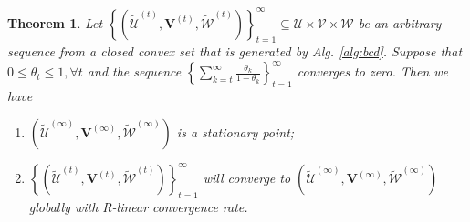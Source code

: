 \documentclass{article}
\newtheorem{thm}{Theorem}
\begin{document}
\begin{thm}\label{thm:BCD}
Let $\left\{\left(\tilde{\mathcal{U}}^{(t)}, \mathbf{V}^{(t)}, \tilde{\mathcal{W}}^{(t)}\right)\right\}_{t=1}^{\infty}\subseteq\mathcal{U}\times\mathcal{V}\times\mathcal{W}$ be an arbitrary sequence from a closed convex set that is generated by Alg. \ref{alg:bcd}. Suppose that $0\leq\theta_t\leq 1, \forall t$ and the sequence $\left\{\sum_{k=t}^{\infty}\frac{\theta_k}{1-\theta_k}\right\}_{t=1}^{\infty}$ converges to zero. Then we have
\begin{enumerate}
\item $\left(\tilde{\mathcal{U}}^{(\infty)}, \mathbf{V}^{(\infty)}, \tilde{\mathcal{W}}^{(\infty)}\right)$ is a stationary point;
\item $\left\{\left(\tilde{\mathcal{U}}^{(t)}, \mathbf{V}^{(t)}, \tilde{\mathcal{W}}^{(t)}\right)\right\}_{t=1}^{\infty}$ will converge to $\left(\tilde{\mathcal{U}}^{(\infty)}, \mathbf{V}^{(\infty)}, \tilde{\mathcal{W}}^{(\infty)}\right)$ globally with R-linear convergence rate.
\end{enumerate}
\end{thm}
\end{document}
